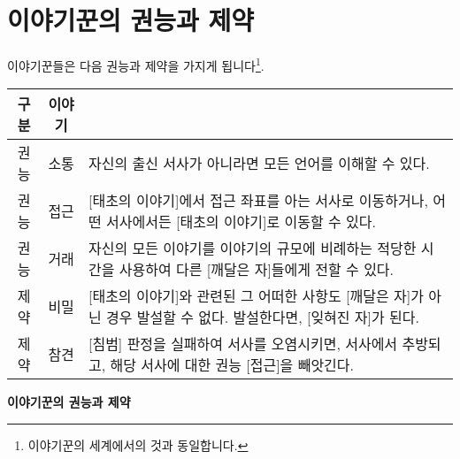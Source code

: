 \documentclass{report}
\begin{document}
	\hypertarget{ability-limit-lite}{}
	\section*{이야기꾼의 권능과 제약}
	이야기꾼들은 다음 권능과 제약을 가지게 됩니다\footnote{이야기꾼의 세계에서의 것과 동일합니다.}.
	
	\smallskip
	
	\begin{minipage}{\textwidth}
		\begin{tabularx}{\textwidth}{c!{\color{black}\vrule}c!{\color{black}\vrule}X}
			\hline
			\textbf{구분} & \textbf{이야기} &  \\ \hline \hline
			권능 & 소통 & 자신의 출신 서사가 아니라면 모든 언어를 이해할 수 있다. \\ \hline
			권능 & 접근 & [태초의 이야기]에서 접근 좌표를 아는 서사로 이동하거나, 어떤 서사에서든 [태초의 이야기]로 이동할 수 있다. \\ \hline
			권능 & 거래 & 자신의 모든 이야기를 이야기의 규모에 비례하는 적당한 시간을 사용하여 다른 [깨달은 자]들에게 전할 수 있다. \\ \hline
			제약 & 비밀 & [태초의 이야기]와 관련된 그 어떠한 사항도 [깨달은 자]가 아닌 경우 발설할 수 없다. 발설한다면, [잊혀진 자]가 된다. \\ \hline
			제약 & 참견 & [침범] 판정을 실패하여 서사를 오염시키면, 서사에서 추방되고, 해당 서사에 대한 권능 [접근]을 빼앗긴다. \\\hline
		\end{tabularx}
		
		\smallskip
		
		\begin{tightcenter}
			\textbf{이야기꾼의 권능과 제약}
		\end{tightcenter}
	\end{minipage}
	
\end{document}
